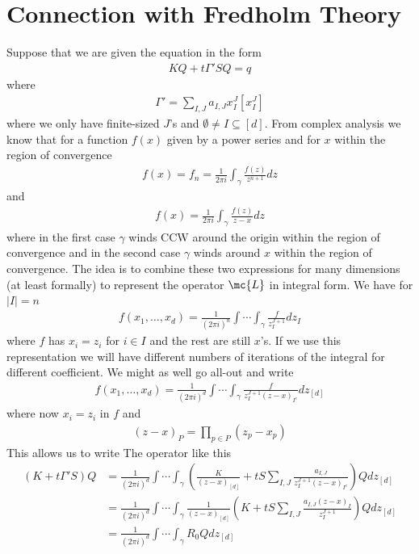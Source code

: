 \section{Connection with Fredholm Theory}
Suppose that we are given the equation in the form
\begin{align}
	KQ +t\Gamma'SQ = q
\end{align}
where
\begin{align}
	\Gamma' = \sum_{I,J}a_{I,J} x_I^J[x_I^J]
\end{align}
where we only have finite-sized $J$'s and $\emptyset \neq I\subseteq [d]$. From complex analysis we know that for a function $f(x)$ given by a power series and for $x$ within the region of convergence
\begin{align}
	[x^n]f(x) = f_n = \frac{1}{2\pi i}\int_\gamma \frac{f(z)}{z^{n+1}}dz
\end{align}
and
\begin{align}
	f(x) = \frac{1}{2\pi i}\int_\gamma \frac{f(z)}{z-x}dz
\end{align}
where in the first case $\gamma$ winds CCW around the origin within the region of convergence and in the second case $\gamma$ winds around $x$ within the region of convergence. The idea is to combine these two expressions for many dimensions (at least formally) to represent the operator $\mc{L}$ in integral form. We have for $|I| = n$
\begin{align}
	[x_I^J]f(x_1,\ldots,x_d)= \frac{1}{(2\pi i)^{n}}\int\cdots\int_\gamma \frac{f}{z_I^{J+1}}dz_I
\end{align}
where $f$ has $x_i = z_i$ for $i \in I$ and the rest are still $x$'s. If we use this representation we will have different numbers of iterations of the integral for different coefficient. We might as well go all-out and write
\begin{align}
	[x_I^J]f(x_1,\ldots,x_d)= \frac{1}{(2\pi i)^d}\int\cdots\int_\gamma \frac{f}{z_I^{J+1}(z-x)_{I^c}}dz_{[d]}
\end{align}
where now $x_i = z_i$ in $f$ and 
\begin{align}
	(z-x)_P = \prod_{p\in P} (z_p-x_p)
\end{align}
This allows us to write The operator like this
\begin{align}
	(K+t\Gamma'S)Q&= \frac{1}{(2\pi i)^d}\int\cdots\int_\gamma \left(\frac{K}{(z-x)_{[d]}} +t S\sum_{I,J}\frac{a_{I,J}}{z_I^{J+1}(z-x)_{I^c}}\right)Q dz_{[d]}\\
	& = \frac{1}{(2\pi i)^d}\int\cdots\int_\gamma \frac{1}{(z-x)_{[d]}}\left(K +t S\sum_{I,J}\frac{a_{I,J}(z-x)_I}{z_I^{J+1}}\right)Q dz_{[d]}\\
	&= \frac{1}{(2\pi i)^d}\int\cdots\int_\gamma R_0Q dz_{[d]}
\end{align}
